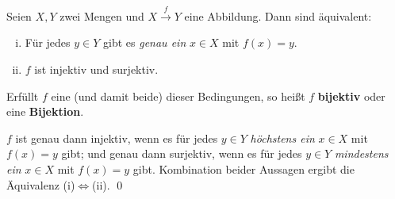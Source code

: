 \begin{defin} \label{def:bijektiv} 
    Seien $X,Y$ zwei Mengen und $X\xrightarrow{f} Y$ eine Abbildung. Dann sind äquivalent:
    \begin{enumerate}[(i)]
        \item Für jedes $y\in Y$ gibt es \emph{genau ein} $x\in X$ mit $f(x)=y$.
        \item $f$ ist injektiv und surjektiv.
    \end{enumerate}
    Erfüllt $f$ eine (und damit beide) dieser Bedingungen, so heißt $f$ \textbf{bijektiv} oder eine \textbf{Bijektion}.
\end{defin}


\begin{bew}
    $f$ ist genau dann injektiv, wenn es für jedes $y\in Y$ \emph{höchstens ein} $x\in X$ mit $f(x)=y$ gibt; und genau dann surjektiv, wenn es für jedes $y\in Y$ \emph{mindestens ein} $x\in X$ mit $f(x)=y$ gibt. Kombination beider Aussagen ergibt die Äquivalenz (i)$\Leftrightarrow$(ii). \qed
\end{bew}


